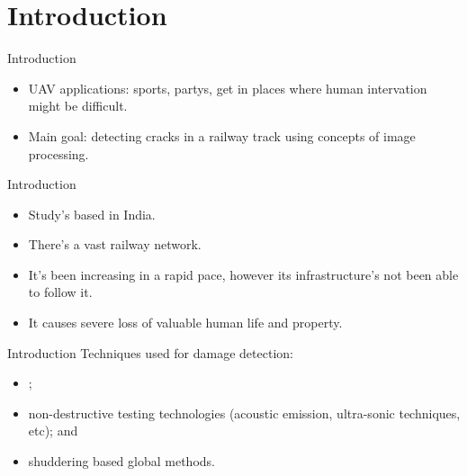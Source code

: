 \section{Introduction}

\begin{frame}{Introduction}
    \begin{itemize}
        \item UAV applications: sports, partys, get in places where human intervation might be difficult.
        \item Main goal: detecting cracks in a railway track using concepts of image processing.
    \end{itemize}
\end{frame}


\begin{frame}{Introduction}
    \begin{itemize}
        \item Study's based in India.
        \item There's a vast railway network.
        \item It's been increasing in a rapid pace, however its infrastructure's not been able to follow it. 
        \item It causes  severe loss of valuable human life and property.
    \end{itemize}
\end{frame}


\begin{frame}{Introduction}
    Techniques used for damage detection:
    \begin{itemize}
        \item {};
        \item non-destructive testing technologies (acoustic emission, ultra-sonic techniques, etc); and
        \item shuddering based global methods. 
    \end{itemize}
\end{frame}


